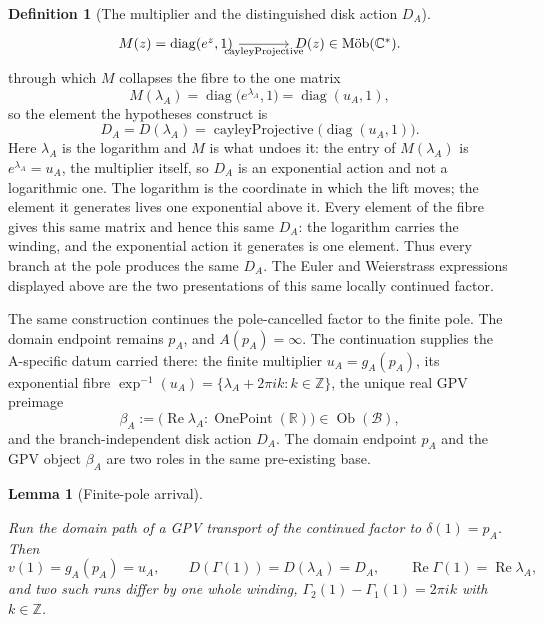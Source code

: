 \documentclass[11pt]{article}
\newcommand{\CC}{\mathbb{C}}
\newcommand{\RR}{\mathbb{R}}
\newcommand{\ZZ}{\mathbb{Z}}
\providecommand{\lean}[1]{}
\providecommand{\uses}[1]{}
\theoremstyle{plain}
\newtheorem{lemma}[theorem]{Lemma}
\theoremstyle{definition}
\newtheorem{definition}[theorem]{Definition}
\theoremstyle{remark}
\begin{document}
\begin{definition}[The multiplier and the distinguished disk action $D_A$]
\[\begin{tikzcd}[column sep=large,row sep=large]
M(z)=\operatorname{diag}(e^z,1)
  \arrow[r,"\operatorname{cayleyProjective}"'] &
D(z)\in\operatorname{M\ddot ob}(\CC^*).
\end{tikzcd}
\]
through which $M$ collapses the fibre to the one matrix
\[
  M(\lambda_A)=\operatorname{diag}\bigl(e^{\lambda_A},1\bigr)=\operatorname{diag}(u_A,1),
\]
so the element the hypotheses construct is
\[
 D_A=D(\lambda_A)
   =\operatorname{cayleyProjective}\bigl(\operatorname{diag}(u_A,1)\bigr).
\]
Here $\lambda_A$ is the logarithm and $M$ is what undoes it: the entry of
$M(\lambda_A)$ is $e^{\lambda_A}=u_A$, the multiplier itself, so $D_A$ is an
exponential action and not a logarithmic one. The logarithm is the coordinate
in which the lift moves; the element it generates lives one exponential above
it. Every element of the fibre gives this same matrix and hence this same $D_A$: the
logarithm carries the winding, and the exponential action it generates is one element.
Thus every branch at the pole produces the same $D_A$. The Euler and
Weierstrass expressions displayed above are the two presentations of this
same locally continued factor.
\end{definition}

The same construction continues the pole-cancelled factor to the finite
pole. The domain endpoint remains $p_A$, and $A(p_A)=\infty$. The
continuation supplies the A-specific datum carried there: the
finite multiplier $u_A=g_A(p_A)$, its exponential fibre
$\exp^{-1}(u_A)=\{\lambda_A+2\pi ik:k\in\ZZ\}$, the unique real GPV
preimage
\[
  \beta_A:=\bigl(\operatorname{Re}\lambda_A:\operatorname{OnePoint}(\RR)\bigr)
     \in\operatorname{Ob}(\mathcal B),
\]
and the branch-independent disk action $D_A$. The domain endpoint $p_A$ and
the GPV object $\beta_A$ are two roles in the same pre-existing base.

\begin{lemma}[Finite-pole arrival]\label{lem:finite-pole-arrival}
\lean{ASection.GpvTransport.value_one_pole,
ASection.GpvTransport.diskExpAction_at_pole,
ASection.GpvTransport.level_at_pole,
ASection.GpvTransport.joint_winding,
ASection.GpvTransport.joint_re_eq}
\uses{def:gpv-transport, def:DA, lem:real-level}
Run the domain path of a GPV transport of the continued factor to
$\delta(1)=p_A$. Then
\[
  v(1)=g_A(p_A)=u_A,\qquad
  D(\Gamma(1))=D(\lambda_A)=D_A,\qquad
  \operatorname{Re}\Gamma(1)=\operatorname{Re}\lambda_A,
\]
and two such runs differ by one whole winding,
$\Gamma_2(1)-\Gamma_1(1)=2\pi ik$ with $k\in\ZZ$.
\end{lemma}
\end{document}
